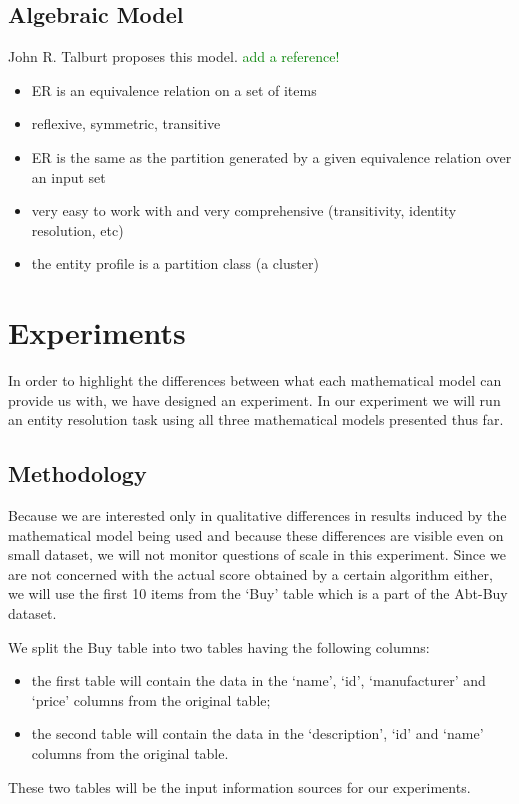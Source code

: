 \documentclass[11pt]{article}
\begin{document}
    \subsection[algebraic]{Algebraic Model}\label{subsec:algebraic}

    John R. Talburt proposes this model. 
    \textcolor{green}{add a reference!}
    \begin{itemize}
        \item ER is an equivalence relation on a set of items
        \item reflexive, symmetric, transitive
        \item ER is the same as the partition generated by a given equivalence relation over an input set
        \item very easy to work with and very comprehensive (transitivity, identity resolution, etc)
        \item the entity profile is a partition class (a cluster)
    \end{itemize}

    \section{Experiments}

    In order to highlight the differences between what each mathematical model
    can provide us with, we have designed an experiment.
    In our experiment we will run an entity resolution task using all three
    mathematical models presented thus far.

    \subsection{Methodology}

    Because we are interested only in qualitative differences in results induced
    by the mathematical model being used and because these differences are
    visible even on small dataset, we will not monitor questions of scale in
    this experiment.
    Since we are not concerned with the actual score obtained by a certain
    algorithm either, we will use the first 10 items from the `Buy' table which
    is a part of the Abt-Buy dataset\cite{vldb2010}.
    
    We split the Buy table into two tables having the following columns:
    \begin{itemize}
        \item the first table will contain the data in the `name', `id',
        `manufacturer' and `price' columns from the original table;
        \item the second table will contain the data in the `description', `id'
        and `name' columns from the original table.
    \end{itemize}
    These two tables will be the input information sources for our experiments.
\end{document}
